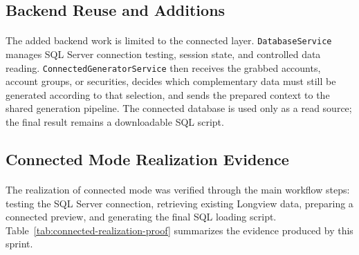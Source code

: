 \subsection{Backend Reuse and Additions}

\paragraph{}The added backend work is limited to the connected layer. \texttt{DatabaseService} manages
SQL Server connection testing, session state, and controlled data reading. \texttt{ConnectedGeneratorService}
then receives the grabbed accounts, account groups, or securities, decides which complementary data
must still be generated according to that selection, and sends the prepared context to the shared
generation pipeline. The
connected database is used only as a read source; the final result remains a downloadable SQL script.

\subsection{Connected Mode Realization Evidence}

\paragraph{}The realization of connected mode was verified through the main workflow steps: testing
the SQL Server connection, retrieving existing Longview data, preparing a connected preview, and
generating the final SQL loading script. Table~\ref{tab:connected-realization-proof} summarizes the
evidence produced by this sprint.

